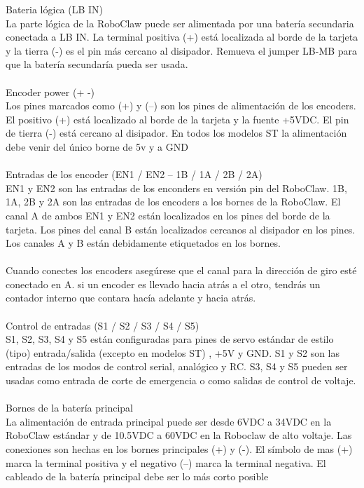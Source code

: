 \documentclass[user_manual.tex]{subfiles}
\begin{document}
Bateria lógica (LB IN)\\
La parte lógica de la RoboClaw puede ser alimentada por una batería secundaria conectada a LB IN. La terminal positiva
(+) está localizada al borde de la tarjeta y la tierra (-) es el pin más cercano al disipador. Remueva el jumper LB-MB
para que la batería secundaría pueda ser usada.\\
\\
Encoder power (+ -)\\
Los pines marcados como (+) y (–) son los pines de alimentación  de los encoders. El positivo (+) está localizado al
borde de la tarjeta y la fuente +5VDC. El pin de tierra (-) está cercano al disipador. En todos los modelos ST la
alimentación debe venir del único borne de 5v  y a GND\\
\\
Entradas de los encoder (EN1 / EN2 – 1B / 1A / 2B / 2A)\\ 
EN1 y EN2 son las entradas de los enconders en versión pin del RoboClaw. 1B, 1A, 2B y 2A son las entradas de los encoders
a los bornes de la RoboClaw. El canal A de ambos EN1 y EN2 están localizados en los pines del borde de la tarjeta.
Los pines del canal B están localizados cercanos al disipador en los pines. Los canales A y B están debidamente etiquetados
en los bornes.\\
\\
Cuando conectes los encoders asegúrese que el canal para la dirección de giro esté conectado en A. si un encoder es
llevado hacia atrás a el otro, tendrás un contador interno que contara hacía adelante y hacia atrás. \\
\\
Control de entradas (S1 / S2 / S3 / S4 / S5)\\
S1, S2, S3, S4 y S5 están configuradas para pines de servo estándar de estilo (tipo) entrada/salida (excepto en modelos ST)
, +5V y GND. S1 y S2 son las entradas  de los modos de control serial, analógico y RC. S3, S4 y S5 pueden ser usadas como
entrada de corte de emergencia o como salidas de control de voltaje.\\
\\
Bornes de la batería principal\\
La alimentación de entrada principal puede ser desde 6VDC a 34VDC en la RoboClaw estándar y de 10.5VDC a 60VDC en la Roboclaw
de alto voltaje. Las conexiones son hechas en los bornes principales (+) y (-). El símbolo de mas (+) marca la terminal
positiva y el negativo (–) marca la terminal negativa. El cableado de la batería principal debe ser lo más corto posible \\
\end{document}
